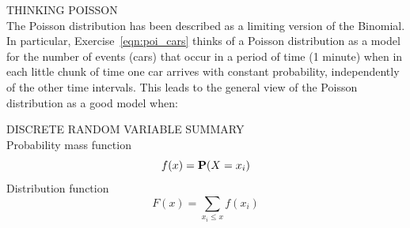 \bigskip

\begin{framed}
THINKING POISSON\\

The Poisson distribution has been described as a limiting version of the
Binomial. In particular, Exercise~\ref{eqn:poi_cars} thinks of a Poisson distribution as a model for the number of events (cars) that occur in a period of time (1 minute) when in each little chunk of time one car arrives with constant probability, independently of the other time intervals. This leads to the general view of the Poisson distribution as a good model when:



\end{framed}


DISCRETE RANDOM VARIABLE SUMMARY\\

Probability mass function $$f(x)=\mathbf{P}(X=x_i)$$
Distribution function $$F(x)=\sum_{x_i\leq x}f(x_i)$$

